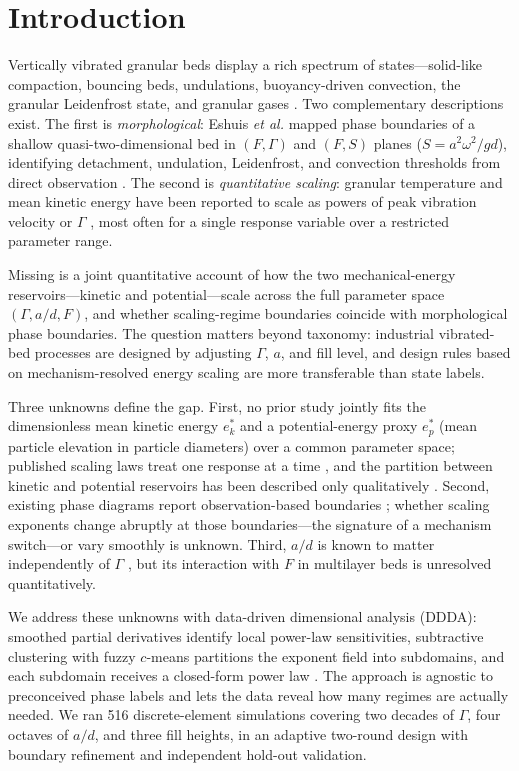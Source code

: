 \documentclass[aps,pre,twocolumn,superscriptaddress,floatfix]{revtex4-2}
\begin{document}
\section{Introduction}
\label{sec:intro}
Vertically vibrated granular beds display a rich spectrum of states---solid-like compaction, bouncing beds, undulations, buoyancy-driven convection, the granular Leidenfrost state, and granular gases \cite{jaeger1996,eshuis2007,meerson2005,rivas2015,eshuis2010}. Two complementary descriptions exist. The first is \emph{morphological}: Eshuis \emph{et al.} mapped phase boundaries of a shallow quasi-two-dimensional bed in $(F,\Gamma)$ and $(F,S)$ planes ($S=a^2\omega^2/gd$), identifying detachment, undulation, Leidenfrost, and convection thresholds from direct observation \cite{eshuis2007}. The second is \emph{quantitative scaling}: granular temperature and mean kinetic energy have been reported to scale as powers of peak vibration velocity or $\Gamma$ \cite{zivkovic2011,hsiau2008,bhateja2016}, most often for a single response variable over a restricted parameter range.

Missing is a joint quantitative account of how the two mechanical-energy reservoirs---kinetic and potential---scale across the full parameter space $(\Gamma,a/d,F)$, and whether scaling-regime boundaries coincide with morphological phase boundaries. The question matters beyond taxonomy: industrial vibrated-bed processes are designed by adjusting $\Gamma$, $a$, and fill level, and design rules based on mechanism-resolved energy scaling are more transferable than state labels.

Three unknowns define the gap. First, no prior study jointly fits the dimensionless mean kinetic energy $e_k^*$ and a potential-energy proxy $e_p^*$ (mean particle elevation in particle diameters) over a common parameter space; published scaling laws treat one response at a time \cite{zivkovic2011,hsiau2008}, and the partition between kinetic and potential reservoirs has been described only qualitatively \cite{eshuis2007}. Second, existing phase diagrams report observation-based boundaries \cite{eshuis2007,rivas2015}; whether scaling exponents change abruptly at those boundaries---the signature of a mechanism switch---or vary smoothly is unknown. Third, $a/d$ is known to matter independently of $\Gamma$ \cite{jaeger1996,bhateja2016}, but its interaction with $F$ in multilayer beds is unresolved quantitatively.

We address these unknowns with data-driven dimensional analysis (DDDA): smoothed partial derivatives identify local power-law sensitivities, subtractive clustering with fuzzy $c$-means partitions the exponent field into subdomains, and each subdomain receives a closed-form power law \cite{constantine2014,buckingham1914}. The approach is agnostic to preconceived phase labels and lets the data reveal how many regimes are actually needed. We ran 516 discrete-element simulations covering two decades of $\Gamma$, four octaves of $a/d$, and three fill heights, in an adaptive two-round design with boundary refinement and independent hold-out validation.
\end{document}
